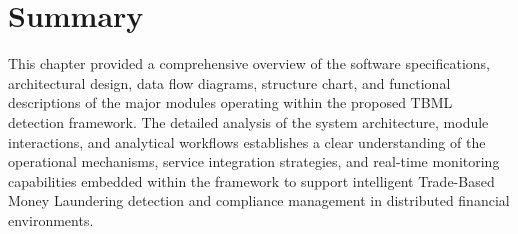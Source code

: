 







\section[Summary]{\textbf{Summary}}

This chapter provided a comprehensive overview of the software specifications, architectural design, data flow diagrams, structure chart, and functional descriptions of the major modules operating within the proposed TBML detection framework. The detailed analysis of the system architecture, module interactions, and analytical workflows establishes a clear understanding of the operational mechanisms, service integration strategies, and real-time monitoring capabilities embedded within the framework to support intelligent Trade-Based Money Laundering detection and compliance management in distributed financial environments.


